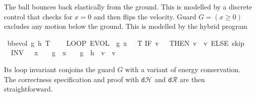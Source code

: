 \documentclass[envcountsame,envcountsect]{llncs}
\newcommand{\IF}[3]{\mathbf{if}\ #1\ \mathbf{then}\ #2\ \mathbf{else}\ #3}
\newcommand{\dH}{\mathsf{d}\mathcal{H}}
\newcommand{\dR}{\mathsf{d}\mathcal{R}}
\newcommand{\flow}{\varphi}
\newcommand{\reals}{\mathbb{R}}
\begin{document}
\begin{example}
\noindent The ball bounces back elastically
from the ground. This is modelled by a
discrete control that checks for $x=0$ and then flips the
velocity.  Guard $G=(x\geq 0)$ excludes any motion
below the ground. This is modelled by the hybrid
program~\cite{Platzer18}
\begin{isabellebody}
\isanewline
{}\isamarkupfalse%
\ {\isachardoublequoteopen}bb{\isacharunderscore}evol\ g\ h\ T\ {\isasymequiv}\ \isanewline
\ \ LOOP\
{\isacharparenleft}EVOL\
{\isacharparenleft}{\isasymphi}\ g{\isacharparenright}\
{\isacharparenleft}x\ {\isasymge}\ {}{\isacharparenright}\
T{\isacharsemicolon} {\isacharparenleft}IF\ {\isacharparenleft}v\ {\isacharequal}\ {}{\isacharparenright}\ THEN\ {\isacharparenleft}v\ {\isacharcolon}{\isacharcolon}{\isacharequal}\ {\isacharminus}v{\isacharparenright}\ ELSE\ skip{\isacharparenright}{\isacharparenright}\ \isanewline
\ \   INV\ {\isacharparenleft}{}\ {\isasymle}\ x\ {\isasymand}\ {}\ {\isasymcdot}\ g\ {\isasymcdot}\ x\ {\isacharequal}\ {}\ {\isasymcdot}\ g\ {\isasymcdot}\ h\ {\isacharplus}\ v\ {\isasymcdot}\ v{\isacharparenright}{\isachardoublequoteclose}\isanewline
\end{isabellebody}
\noindent Its loop invariant conjoins the guard $G$ with a
variant of energy conservation. The correctness
specification and proof with $\dH$ and $\dR$ are then straightforward.

\end{example}
\end{document}
